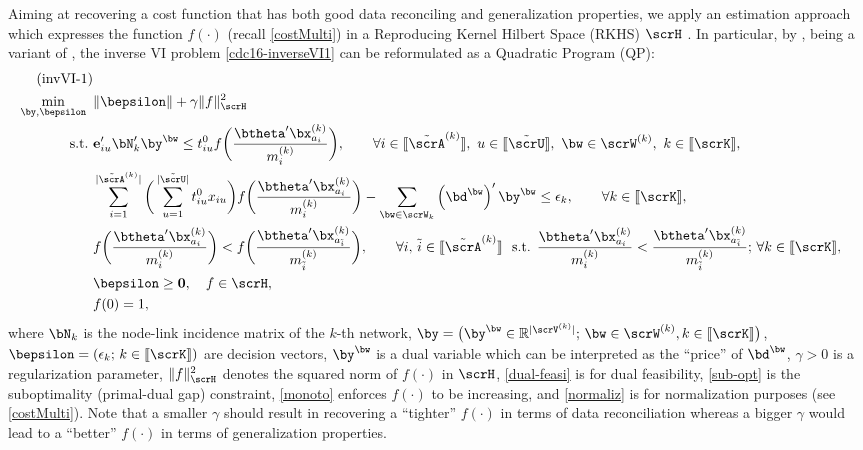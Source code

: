 \documentclass[3p]{elsarticle}
\begin{document}
Aiming at recovering a cost function that has both good data reconciling
and generalization properties, we apply an estimation approach which
expresses the function $f(\cdot)$ (recall \eqref{costMulti}) in a
Reproducing Kernel Hilbert Space (RKHS) $\scrH$
\cite{bertsimas2014data,evgeniou2000regularization}. In particular, by
\cite[Thm. 2]{bertsimas2014data}, being a variant of \cite[(6)]{IFAC17},
the inverse VI problem \eqref{cdc16-inverseVI1} can be reformulated as a
Quadratic Program (QP):
\begin{align}
	\text{(invVI-1)} \notag \\
	\mathop {\min }\limits_{\by,\bepsilon} {\text{  }}& \|\bepsilon\| + \gamma\| {f} \|^2_{\scrH} \label{inverVI2-multi-pre} \\
	\text{s.t.}{\text{  }}&{\textbf{e}}_{iu}'\bN'_k{\by^\bw} \leq t_{iu}^{{0}}{{{f}\bigg( \frac{{{{\btheta}}'\bx_{a_i}^{{(k)}}}}{{{m_{i}^{{(k)}}}}} \bigg)}}, \qquad \forall i \in [\kern-0.15em[ \tilde\scrA^{{(k)}} 
	]\kern-0.15em], ~u \in [\kern-0.15em[ \tilde\scrU 
	]\kern-0.15em], ~\bw \in {\scrW^{{(k)}}}, ~k \in [\kern-0.15em[ \scrK 
	]\kern-0.15em],  \label{dual-feasi} \\
	&\sum\limits_{i=1}^{|\tilde\scrA^{{(k)}}|} \bigg(\sum\limits_{u=1}^{|\tilde\scrU|} {t_{iu}^{{0}}{x_{iu}}}\bigg) {{{f}\bigg( \frac{{{{\btheta}}'\bx_{a_i}^{{(k)}}}}{{{m_{i}^{{(k)}}}}} \bigg)}} - \sum\limits_{\bw \in {\scrW_k}} {\left( {{\bd^\bw}} \right)'{\by^\bw}}  \leq {\epsilon_k},  \qquad \forall k \in [\kern-0.15em[ \scrK 
	]\kern-0.15em],  \label{sub-opt} \\
	&{ {{f}\bigg( \frac{{{{\btheta}}'\bx_{a_i}^{{(k)}}}}{{{m_{i}^{{(k)}}}}} \bigg)}} < {{{f}\bigg( \frac{{{{\btheta}}'\bx_{a_{\tilde i}}^{{(k)}}}}{{{m^{{(k)}}_{{\tilde i}}}}} \bigg)}}, \qquad \forall i, \, \tilde{i} \in [\kern-0.15em[ \tilde\scrA^{{(k)}} 
	]\kern-0.15em]
	~{\text{ s}}{\text{.t}}{\text{. }}\frac{{{{\btheta}}'\bx_{a_i}^{{(k)}}}}{{{m_{i}^{{(k)}}}}} < \frac{{{{\btheta}}'\bx_{a_{\tilde i}}^{{(k)}}}}{{{m^{{(k)}}_{{\tilde i}}}}}; \,\forall k \in [\kern-0.15em[ \scrK 
	]\kern-0.15em],  \label{monoto} \\
	& \bepsilon \geq \textbf{0}, \quad 
	{f} \in \scrH, \notag \\
	&{f(0)} = 1, \label{normaliz} 
\end{align}
where $\bN_k$ is the node-link incidence matrix of the $k$-th network,
$\by = \big( {{\by^{\bw} \in {\mathbb{R}^{| \scrV^{{(k)}} |}}};\, \bw
  \in \scrW^{{(k)}}, k \in [\kern-0.15em[ \scrK ]\kern-0.15em]} \big)$,
$\bepsilon = (\epsilon_k; \,k \in [\kern-0.15em[ \scrK ]\kern-0.15em])$
are decision vectors, $\by^{\bw}$ is a dual variable which can be
interpreted as the ``price'' of $\bd^{\bw}$, $\gamma > 0$ is a
regularization parameter, $\| {f} \|^2_{\scrH}$ denotes the squared norm
of $f(\cdot)$ in $\scrH$, \eqref{dual-feasi} is for dual feasibility,
\eqref{sub-opt} is the suboptimality (primal-dual gap) constraint,
\eqref{monoto} enforces $f(\cdot)$ to be increasing, and
\eqref{normaliz} is for normalization purposes (see \eqref{costMulti}).
Note that a smaller $\gamma$ should result in recovering a ``tighter''
$f(\cdot)$ in terms of data reconciliation whereas a bigger $\gamma$
would lead to a ``better'' $f(\cdot)$ in terms of generalization
properties.
	
\end{document}
